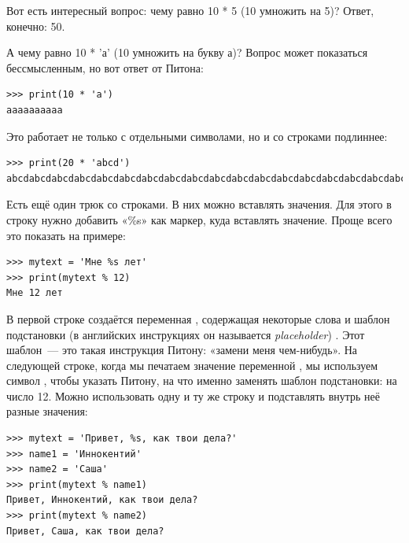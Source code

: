 Вот есть интересный вопрос: чему равно 10 * 5 (10 умножить на 5)? Ответ, конечно: 50.


А чему равно 10 * 'а' (10 умножить на букву а)? Вопрос может показаться бессмысленным, но вот ответ от Питона:

\begin{listing}
\begin{verbatim}
>>> print(10 * 'a')
aaaaaaaaaa
\end{verbatim}
\end{listing}

Это работает не только с отдельными символами, но и со строками подлиннее:

\begin{listing}
\begin{verbatim}
>>> print(20 * 'abcd')
abcdabcdabcdabcdabcdabcdabcdabcdabcdabcdabcdabcdabcdabcdabcdabcdabcdabcdabcdabcd
\end{verbatim}
\end{listing}

Есть ещё один трюк со строками. В них можно вставлять значения. Для этого в строку нужно добавить «\%s» как маркер, куда вставлять значение. Проще всего это показать на примере:

\begin{listing}
\begin{verbatim}
>>> mytext = 'Мне %s лет'
>>> print(mytext % 12)
Мне 12 лет
\end{verbatim}
\end{listing}

В первой строке создаётся переменная , содержащая некоторые слова и шаблон подстановки (в английских инструкциях он называется \emph{placeholder}) . Этот шаблон — это такая инструкция Питону: «замени меня чем-нибудь». На следующей строке, когда мы печатаем значение переменной , мы используем символ \code{\%}, чтобы указать Питону, на что именно заменять шаблон подстановки: на число 12. Можно использовать одну и ту же строку и подставлять внутрь неё разные значения:

\begin{listing}
\begin{verbatim}
>>> mytext = 'Привет, %s, как твои дела?'
>>> name1 = 'Иннокентий'
>>> name2 = 'Саша'
>>> print(mytext % name1)
Привет, Иннокентий, как твои дела?
>>> print(mytext % name2)
Привет, Саша, как твои дела?
\end{verbatim}
\end{listing}

